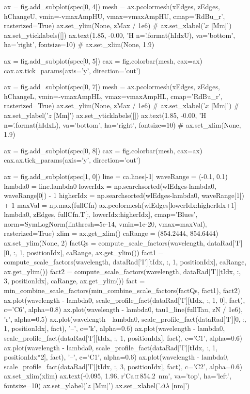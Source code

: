 \begin{pycode}[2DRT]
    ax = fig.add_subplot(spec[0, 4])
    mesh = ax.pcolormesh(xEdges, zEdges, hChangeU, vmin=-vmaxAmpHU, vmax=vmaxAmpHU,
                         cmap='RdBu_r', rasterized=True)
    ax.set_ylim(None, zMax / 1e6)
    # ax.set_xlabel('$x$ [Mm]')
    ax.set_yticklabels([])
    ax.text(1.85, -0.00, 'H n={}'.format(hIdxU), va='bottom', ha='right', fontsize=10)
    # ax.set_xlim(None, 1.9)

    ax = fig.add_subplot(spec[0, 5])
    cax = fig.colorbar(mesh, cax=ax)
    cax.ax.tick_params(axis='y', direction='out')

    ax = fig.add_subplot(spec[0, 7])
    mesh = ax.pcolormesh(xEdges, zEdges, hChangeL, vmin=-vmaxAmpHL, vmax=vmaxAmpHL,
                         cmap='RdBu_r', rasterized=True)
    ax.set_ylim(None, zMax / 1e6)
    # ax.set_xlabel('$x$ [Mm]')
    # ax.set_ylabel('$z$ [Mm]')
    ax.set_yticklabels([])
    ax.text(1.85, -0.00, 'H n={}'.format(hIdxL), va='bottom', ha='right', fontsize=10)
    # ax.set_xlim(None, 1.9)

    ax = fig.add_subplot(spec[0, 8])
    cax = fig.colorbar(mesh, cax=ax)
    cax.ax.tick_params(axis='y', direction='out')

    ax = fig.add_subplot(spec[1, 0])
    line = ca.lines[-1]
    waveRange = (-0.1, 0.1)
    lambda0 = line.lambda0
    lowerIdx = np.searchsorted(wlEdges-lambda0, waveRange[0]) - 1
    higherIdx = np.searchsorted(wlEdges-lambda0, waveRange[1]) + 1
    maxVal = np.max(fullCfn)
    ax.pcolormesh(wlEdges[lowerIdx:higherIdx+1]-lambda0, zEdges, fullCfn.T[:, lowerIdx:higherIdx],
                  cmap='Blues', norm=SymLogNorm(linthresh=5e-14, vmin=1e-20, vmax=maxVal), rasterized=True)
    xlim = ax.get_xlim()
    caRange = (854.2444, 854.6444)
    ax.set_ylim(None, 2)
    factQs = compute_scale_factors(wavelength, dataRad['I'][0, :, 1, positionIdx], caRange, ax.get_ylim())
    fact1 = compute_scale_factors(wavelength, dataRad['I'][tIdx, :, 1, positionIdx], caRange, ax.get_ylim())
    fact2 = compute_scale_factors(wavelength, dataRad['I'][tIdx, :, 3, positionIdx], caRange, ax.get_ylim())
    fact = min_combine_scale_factors(min_combine_scale_factors(factQs, fact1), fact2)
    ax.plot(wavelength - lambda0,
            scale_profile_fact(dataRad['I'][tIdx, :, 1, 0], fact),  c='C6', alpha=0.8)
    ax.plot(wavelength - lambda0, tau1_line(fullTau, zN / 1e6), 'r', alpha=0.5)
    ax.plot(wavelength - lambda0,
            scale_profile_fact(dataRad['I'][0, :, 1, positionIdx], fact), '--', c='k', alpha=0.6)
    ax.plot(wavelength - lambda0,
            scale_profile_fact(dataRad['I'][tIdx, :, 1, positionIdx], fact), c='C1', alpha=0.6)
    ax.plot(wavelength - lambda0,
            scale_profile_fact(dataRad['I'][tIdx, :, 1, positionIdx*2], fact), '--', c='C1', alpha=0.6)
    ax.plot(wavelength - lambda0,
            scale_profile_fact(dataRad['I'][tIdx, :, 3, positionIdx], fact), c='C2', alpha=0.6)
    ax.set_xlim(xlim)
    ax.text(-0.095, 1.96, r'Ca\,\textsc{ii}\,\SI{854.2}{\nano\metre}', va='top', ha='left', fontsize=10)
    ax.set_ylabel('$z$ [Mm]')
    ax.set_xlabel('$\Delta\lambda$ [nm]')


\end{pycode}
